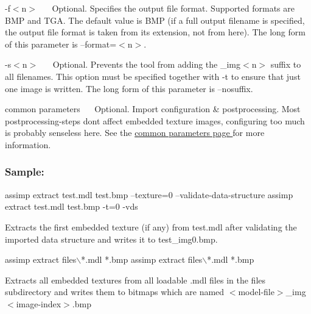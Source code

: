 {\ttfamily -\/f$<$n$>$~\newline
 }~\newline
 Optional. Specifies the output file format. Supported formats are B\+M\+P and T\+G\+A. The default value is B\+M\+P (if a full output filename is specified, the output file format is taken from its extension, not from here). The long form of this parameter is {\ttfamily --format=$<$n$>$}. 

{\ttfamily -\/s$<$n$>$~\newline
 }~\newline
 Optional. Prevents the tool from adding the {\ttfamily \+\_\+img$<$n$>$} suffix to all filenames. This option must be specified together with -\/t to ensure that just one image is written. The long form of this parameter is {\ttfamily --nosuffix}. 

{\ttfamily  common parameters~\newline
}~\newline
 Optional. Import configuration \& postprocessing. Most postprocessing-\/steps don\textquotesingle{}t affect embedded texture images, configuring too much is probably senseless here. See the \hyperlink{common}{common parameters page } for more information. 





\subsubsection*{Sample\+:}


\begin{DoxyCode}
assimp extract test.mdl test.bmp --texture=0 --validate-data-structure
assimp extract test.mdl test.bmp -t=0 -vds
\end{DoxyCode}


Extracts the first embedded texture (if any) from test.\+mdl after validating the imported data structure and writes it to {\ttfamily test\+\_\+img0.\+bmp}.


\begin{DoxyCode}
assimp extract files\(\backslash\)*.mdl *.bmp 
assimp extract files\(\backslash\)*.mdl *.bmp 
\end{DoxyCode}


Extracts all embedded textures from all loadable .mdl files in the \textquotesingle{}files\textquotesingle{} subdirectory and writes them to bitmaps which are named {\ttfamily $<$model-\/file$>$\+\_\+img$<$image-\/index$>$.bmp} 